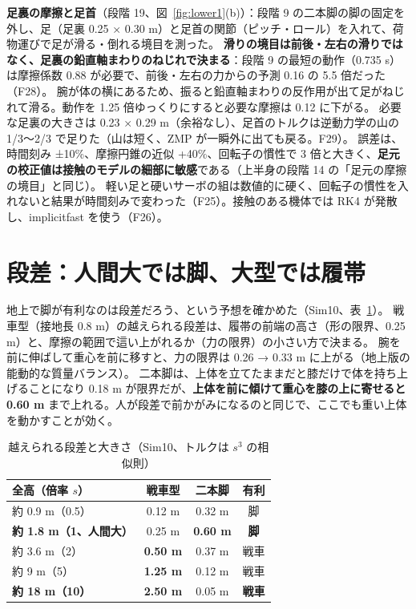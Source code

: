 \documentclass[paper=a4paper,fontsize=10pt,twocolumn,column_gap=2zw,line_length=24zw,number_of_lines=46,head_space=20mm]{jlreq}
\begin{document}
\textbf{足裏の摩擦と足首}（段階 19、図~\ref{fig:lower1}(b)）：段階 9 の二本脚の脚の固定を外し、足（足裏 0.25 × 0.30 m）と足首の関節（ピッチ・ロール）を入れて、荷物運びで足が滑る・倒れる境目を測った。
\textbf{滑りの境目は前後・左右の滑りではなく、足裏の鉛直軸まわりのねじれで決まる}：段階 9 の最短の動作（0.735 s）は摩擦係数 0.88 が必要で、前後・左右の力からの予測 0.16 の 5.5 倍だった（F28）。
腕が体の横にあるため、振ると鉛直軸まわりの反作用が出て足がねじれて滑る。動作を 1.25 倍ゆっくりにすると必要な摩擦は 0.12 に下がる。
必要な足裏の大きさは 0.23 × 0.29 m（余裕なし）、足首のトルクは逆動力学の山の 1/3〜2/3 で足りた（山は短く、ZMP が一瞬外に出ても戻る。F29）。
誤差は、時間刻み ±10\%、摩擦円錐の近似 +40\%、回転子の慣性で 3 倍と大きく、\textbf{足元の校正値は接触のモデルの細部に敏感}である（上半身の段階 14 の「足元の摩擦の境目」と同じ）。
軽い足と硬いサーボの組は数値的に硬く、回転子の慣性を入れないと結果が時間刻みで変わった（F25）。接触のある機体では RK4 が発散し、implicitfast を使う（F26）。

\section{段差：人間大では脚、大型では履帯}\label{sec:steps}

地上で脚が有利なのは段差だろう、という予想を確かめた（Sim10、表~\ref{tab:steps}）。
戦車型（接地長 0.8 m）の越えられる段差は、履帯の前端の高さ（形の限界、0.25 m）と、摩擦の範囲で這い上がれるか（力の限界）の小さい方で決まる。
腕を前に伸ばして重心を前に移すと、力の限界は 0.26 → 0.33 m に上がる（地上版の能動的な質量バランス）。
二本脚は、上体を立てたままだと膝だけで体を持ち上げることになり 0.18 m が限界だが、\textbf{上体を前に傾けて重心を膝の上に寄せると 0.60 m} まで上れる。人が段差で前かがみになるのと同じで、ここでも重い上体を動かすことが効く。

\begin{table}[t]\centering\small
\caption{越えられる段差と大きさ（Sim10、トルクは $s^3$ の相似則）}\label{tab:steps}
\setlength{\tabcolsep}{3pt}
\begin{tabular}{lccc}\toprule
全高（倍率 $s$） & 戦車型 & 二本脚 & 有利 \\\midrule
約 0.9 m（0.5） & 0.12 m & 0.32 m & 脚 \\
\textbf{約 1.8 m（1、人間大）} & 0.25 m & \textbf{0.60 m} & \textbf{脚} \\
約 3.6 m（2） & \textbf{0.50 m} & 0.37 m & 戦車 \\
約 9 m（5） & \textbf{1.25 m} & 0.12 m & 戦車 \\
\textbf{約 18 m（10）} & \textbf{2.50 m} & 0.05 m & \textbf{戦車} \\\bottomrule
\end{tabular}
\end{table}
\end{document}
